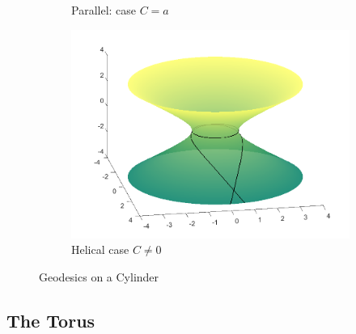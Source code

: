 \documentclass[12pt]{article}
\begin{document}
\begin{figure}[ht]
\begin{subfigure}[b]{0.4\linewidth}
	  \caption{Parallel: case $C=a$}
	  \label{subfig:helix}
	\end{subfigure}
	\hfill
	\begin{subfigure}[b]{0.4\linewidth}
	  \centering
	  \includegraphics[width=1.0\textwidth]{images/hyperboloid1.png}
	  \caption{Helical case $C \neq 0$}
	  \label{subfig:circle}
	\end{subfigure}
	\caption{Geodesics on a Cylinder}
	\label{fig:geodesics-on-cylinder}
\end{figure}

\subsection{The Torus}
\end{document}
